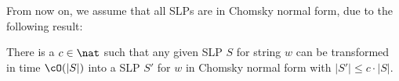 



From now on, we assume that all SLPs are in Chomsky normal form, due to the following result:

\begin{theorem}
	There is a $c\in\nat$ such that any given SLP $S$ for string $w$ can be transformed in time $\cO(|S|)$ into a SLP $S'$ for $w$ in Chomsky normal form with $|S'| \leq c\cdot|S|$.
\end{theorem}

